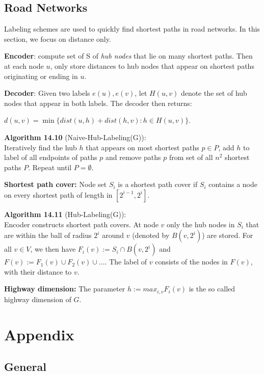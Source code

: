 \documentclass[a4paper, 8pt, landscape]{scrartcl}
\begin{document}
\begin{multicols*}{3}
\subsection{Road Networks}

Labeling schemes are used to quickly find shortest paths in road networks. In this section, we focus on distance only. 

\textbf{Encoder}: compute set of S of \textit{hub nodes} that lie on many shortest paths. Then at each node $u$, only store distances to hub nodes that appear on shortest paths originating or ending in $u$.

\textbf{Decoder}: Given two labels $e(u), e(v)$, let $H(u,v)$ denote the set of hub nodes that appear in both labels. The decoder then returns:
\vspace*{-1mm}
\begin{center}
$d(u,v) = \min\{dist(u,h) + dist(h,v) : h \in H(u,v)\}$.
\end{center}


\textbf{Algorithm 14.10} (Naive-Hub-Labeling(G)):\\
Iteratively find the hub $h$ that appears on most shortest paths $p \in P$, add $h$ to label of all endpoints of paths $p$ and remove paths $p$ from set of all $n^2$ shortest paths $P$. Repeat until $P = \emptyset$.

\textbf{Shortest path cover:} Node set $S_i$ is a shortest path cover if $S_i$ contains a node on every shortest path of length in $[2^{i-1}, 2^i]$.

\textbf{Algorithm 14.11} (Hub-Labeling(G)):\\
Encoder constructs shortest path covers. At node $v$ only the hub nodes in $S_i$ that are within the ball of radius $2^i$ around $v$ (denoted by $B(v, 2^i)$) are stored. For all $v \in V$, we then have $F_i(v) := S_i \cap B(v, 2^i)$ and $F(v) := F_1(v) \cup F_2(v) \cup ...$. The label of $v$ consists of the nodes in $F(v)$, with their distance to $v$.

\textbf{Highway dimension:} The parameter $h := max_{i,v} F_i(v)$ is the so called highway dimension of $G$.

\vspace*{150mm}

\columnbreak

\section{Appendix}

\subsection{General}


\end{multicols*}
\end{document}
